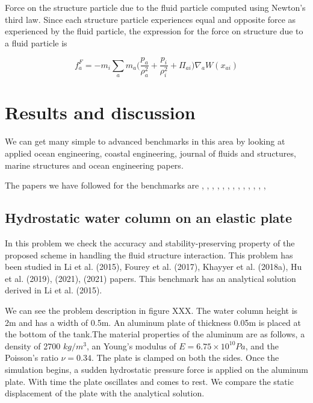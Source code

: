 \documentclass[preprint,12pt]{elsarticle}
\begin{document}
Force on the structure particle due to the fluid particle computed using
Newton's third law. Since each structure particle experiences equal and
opposite force as experienced by the fluid particle, the expression for the
force on structure due to a fluid particle is

\begin{equation}
  f_a^F = -m_i \sum_{a} m_a \bigg(\frac{p_a}{\rho_{a}^2} +
  \frac{p_i}{\rho_{i}^2} + \Pi_{ai} \bigg) \nabla_{a} W(x_{ai})
\end{equation}



\section{Results and discussion}
\label{sec:results}

We can get many simple to advanced benchmarks in this area by looking at
applied ocean engineering, coastal engineering, journal of fluids and
structures, marine structures and ocean engineering papers.


The papers we have followed for the benchmarks are
\citet{sun2021accurate}, \citet{yang2016numerical}, \citet{Sun2019study},
\citet{He2017coupled}, \citet{khayyer2018enhanced}, \citet{sun2015numerical},
\citet{wang2020scale}, \citet{peng2021coupling}, \citet{zhang2021deltasph},
\citet{zhan2019stabilized}, \citet{khayyer2021multi},
\citet{long2021coupling}, \citet{ng2020coupled},



\subsection{Hydrostatic water column on an elastic plate}
\label{sec:results:hstank-elastic-plate}


In this problem we check the accuracy and stability-preserving property of the
proposed scheme in handling the fluid structure interaction. This problem has
been studied in Li et al. (2015), Fourey et al. (2017), Khayyer et
al. (2018a), Hu et al. (2019), (2021), (2021) papers. This benchmark has an
analytical solution derived in Li et al. (2015).

We can see the problem description in figure XXX. The water column height is
2m and has a width of 0.5m. An aluminum plate of thickness 0.05m is placed at
the bottom of the tank.The material properties of the aluminum are as follows,
a density of 2700 $kg/m^3$, an Young’s modulus of $E = 6.75 \times 10^{10} Pa$,
and the Poisson’s ratio $\nu = 0.34$. The plate is clamped on both the
sides. Once the simulation begins, a sudden hydrostatic pressure force is
applied on the aluminum plate. With time the plate oscillates and comes to
rest. We compare the static displacement of the plate with the analytical
solution.
\end{document}

